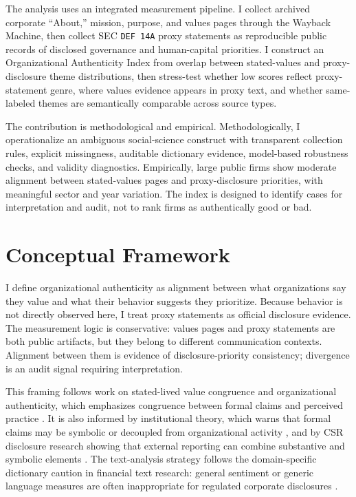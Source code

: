 \documentclass[11pt]{article}
\begin{document}
The analysis uses an integrated measurement pipeline. I collect archived corporate ``About,''
mission, purpose, and values pages through the Wayback Machine, then collect SEC \texttt{DEF 14A}
proxy statements as reproducible public records of disclosed governance and human-capital
priorities. I construct an Organizational Authenticity Index from overlap between stated-values and
proxy-disclosure theme distributions, then stress-test whether low scores reflect proxy-statement
genre, where values evidence appears in proxy text, and whether same-labeled themes are
semantically comparable across source types.

The contribution is methodological and empirical. Methodologically, I operationalize an ambiguous
social-science construct with transparent collection rules, explicit missingness, auditable
dictionary evidence, model-based robustness checks, and validity diagnostics. Empirically, large
public firms show moderate alignment between stated-values pages and proxy-disclosure priorities,
with meaningful sector and year variation. The index is designed to identify cases for
interpretation and audit, not to rank firms as authentically good or bad.

\section{Conceptual Framework}

I define organizational authenticity as alignment between what organizations say they value and
what their behavior suggests they prioritize. Because behavior is not directly observed here, I
treat proxy statements as official disclosure evidence. The measurement logic is conservative:
values pages and proxy statements are both public artifacts, but they belong to different
communication contexts. Alignment between them is evidence of disclosure-priority consistency;
divergence is an audit signal requiring interpretation.

This framing follows work on stated-lived value congruence and organizational authenticity, which
emphasizes congruence between formal claims and perceived practice \cite{pamphile2023}. It is also
informed by institutional theory, which warns that formal claims may be symbolic or decoupled from
organizational activity \cite{meyerrowan1977}, and by CSR disclosure research showing that external
reporting can combine substantive and symbolic elements \cite{shabana2016,hawn2016}. The
text-analysis strategy follows the domain-specific dictionary caution in financial text research:
general sentiment or generic language measures are often inappropriate for regulated corporate
disclosures \cite{loughran2011}.
\end{document}
